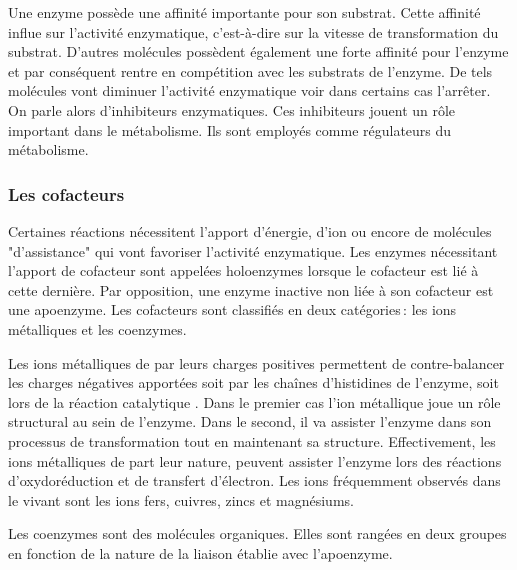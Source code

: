 \begin{refsegment}
    Une enzyme possède une affinité importante pour son substrat. Cette affinité influe sur l’activité enzymatique, c’est-à-dire sur la vitesse de transformation du substrat. D'autres molécules possèdent également une forte affinité pour l’enzyme et par conséquent rentre en compétition avec les substrats de l'enzyme. De tels molécules vont diminuer l’activité enzymatique voir dans certains cas l'arrêter. On parle alors d'inhibiteurs enzymatiques. Ces inhibiteurs jouent un rôle important dans le métabolisme. Ils sont employés comme régulateurs du métabolisme. 
    

    \subsubsection{Les cofacteurs}
    Certaines réactions nécessitent l’apport d'énergie, d’ion ou encore de molécules "d'assistance" qui vont favoriser l’activité enzymatique. Les enzymes nécessitant l'apport de cofacteur sont appelées holoenzymes lorsque le cofacteur est lié à cette dernière. Par opposition, une enzyme inactive non liée à son cofacteur est une apoenzyme. Les cofacteurs sont classifiés en deux catégories : les ions métalliques et les coenzymes.
    
    Les ions métalliques de par leurs charges positives permettent de contre-balancer les charges négatives apportées soit par les chaînes d'histidines de l'enzyme, soit lors de la réaction catalytique \cite{christianson1991structural}. Dans le premier cas l'ion métallique joue un rôle structural au sein de l'enzyme. Dans le second, il va assister l'enzyme dans son processus de transformation tout en maintenant sa structure. Effectivement, les ions métalliques de part leur nature, peuvent assister l'enzyme lors des réactions d'oxydoréduction et de transfert d'électron. Les ions fréquemment observés dans le vivant sont les ions fers, cuivres, zincs et magnésiums.
    
    Les coenzymes sont des molécules organiques. Elles sont rangées en deux groupes en fonction de la nature de la liaison établie avec l'apoenzyme.
    

\end{refsegment}
